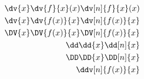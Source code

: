 \begin{align*}
	\dv{x} \dv{f}{x}(x) \dv[n]{f}{x}(x) \\
	\dv{x} \dv{f(x)}{x} \dv[n]{f(x)}{x} \\
	\DV{x} \DV{f(x)}{x} \DV[n]{f(x)}{x} \\
	\dd \dd{x} \dd[n]{x} \\
	\DD \DD{x} \DD[n]{x} \\
	\ddv[n]{f(x)}{x}
\end{align*}